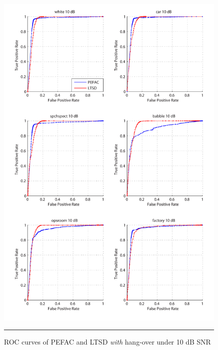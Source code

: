\begin{figure}[htbp]
	\centering
		\includegraphics[width=1.0\columnwidth]{Figures/AppendixA/pefac10.pdf}
		\rule{37em}{0.5pt}
	\caption[ROC curves of PEFAC and LTSD \emph{with} hang-over under 10 dB SNR]{ROC curves of PEFAC and LTSD \emph{with} hang-over under 10 dB SNR}
	\label{fig:pefac10}
\end{figure}